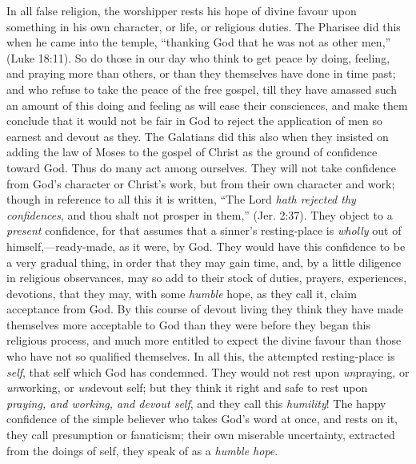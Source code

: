 \documentclass[
]{book}
\begin{document}
In all false religion, the worshipper rests his hope of divine favour upon something in his own character, or life, or religious duties. The Pharisee did this when he came into the temple, ``thanking God that he was not as other men,'' (Luke 18:11). So do those in our day who think to get peace by doing, feeling, and praying more than others, or than they themselves have done in time past; and who refuse to take the peace of the free gospel, till they have amassed such an amount of this doing and feeling as will ease their consciences, and make them conclude that it would not be fair in God to reject the application of men so earnest and devout as they. The Galatians did this also when they insisted on adding the law of Moses to the gospel of Christ as the ground of confidence toward God. Thus do many act among ourselves. They will not take confidence from God's character or Christ's work, but from their own character and work; though in reference to all this it is written, ``The Lord \emph{hath rejected thy confidences}, and thou shalt not prosper in them,'' (Jer. 2:37). They object to a \emph{present} confidence, for that assumes that a sinner's resting-place is \emph{wholly} out of himself,---ready-made, as it were, by God. They would have this confidence to be a very gradual thing, in order that they may gain time, and, by a little diligence in religious observances, may so add to their stock of duties, prayers, experiences, devotions, that they may, with some \emph{humble} hope, as they call it, claim acceptance from God. By this course of devout living they think they have made themselves more acceptable to God than they were before they began this religious process, and much more entitled to expect the divine favour than those who have not so qualified themselves. In all this, the attempted resting-place is \emph{self}, that self which God has condemned. They would not rest upon \emph{un}praying, or \emph{un}working, or \emph{un}devout self; but they think it right and safe to rest upon \emph{praying, and working, and devout self}, and they call this \emph{humility}! The happy confidence of the simple believer who takes God's word at once, and rests on it, they call presumption or fanaticism; their own miserable uncertainty, extracted from the doings of self, they speak of as a \emph{humble hope}.
\end{document}
